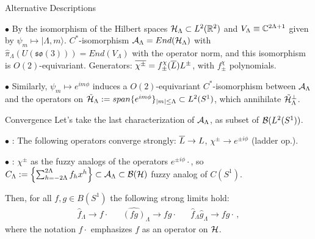 \begin{frame}{Alternative Descriptions} %

     $\bullet$ By the isomorphism of the Hilbert spaces $\mathcal H_\Lambda \subset L^2(\mathbb R^2)$ and $V_\Lambda \equiv \mathbb C^{2\Lambda + 1}$ given by $\psi_m \mapsto |\Lambda, m\rangle$. \Then $C^*$-isomorphism $\mathcal A_\Lambda = End(\mathcal H_\Lambda)$ with $\hat \pi_\Lambda(U(\mathfrak{so}(3))) = End(V_\Lambda)$ with the operator norm, and this isomorphism is $O(2)$-equivariant. Generators: $\overline{\chi^\pm} = f^\chi_{\pm}(\overline{L}) L^\pm$, with $f^\chi_\pm$ polynomials.
     
     $\bullet$ Similarly, $\psi_m \mapsto e^{im\phi}$ induces a $O(2)$-equivariant $C^*$-isomorphism between $\mathcal A_\Lambda$ and the operators on $\tilde {\mathcal H}_\Lambda := span\{e^{im\phi}\}_{|m| \leq \Lambda} \subset L^2(S^1) $, which annihilate $\tilde {\mathcal H}_\Lambda^\perp$.



    
    \end{frame}

\begin{frame}{Convergence} %
    Let's take the last characterization of $\mathcal A_\Lambda$, as subset of $\mathcal B(L^2(S^1))$.

    
    $\bullet$ : The following operators converge strongly: $\overline{L} \to L$, $\chi^\pm \to e^{\pm i\phi}$ (ladder op.).
    
    $\bullet$ : $\chi^\pm$ as the fuzzy analogs of the operators $e^{\pm i\phi}\cdot$, so $C_\Lambda := \left\{ \sum_{h = -2\Lambda}^{2\Lambda} f_h x^h \right\} \subset \mathcal A_\Lambda \subset \mathcal B(\mathcal H)$ fuzzy analog of $C(S^1)$.  
    
    Then, for all $f, g \in B(S^1)$ the following strong limits hold:
\begin{align}
    \hat f_\Lambda \to f\cdot && \hat{(fg)}_\Lambda \to fg\cdot && \hat f_\Lambda \hat g_\Lambda \to fg \cdot\,,
\end{align}
where the notation $f\cdot$ emphasizes $f$ as an operator on $\mathcal H$.
\end{frame}

